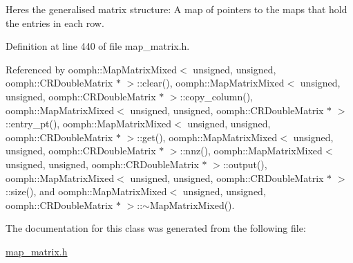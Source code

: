 Here\textquotesingle{}s the generalised matrix structure\+: A map of pointers to the maps that hold the entries in each row. 

Definition at line 440 of file map\+\_\+matrix.\+h.



Referenced by oomph\+::\+Map\+Matrix\+Mixed$<$ unsigned, unsigned, oomph\+::\+C\+R\+Double\+Matrix $\ast$ $>$\+::clear(), oomph\+::\+Map\+Matrix\+Mixed$<$ unsigned, unsigned, oomph\+::\+C\+R\+Double\+Matrix $\ast$ $>$\+::copy\+\_\+column(), oomph\+::\+Map\+Matrix\+Mixed$<$ unsigned, unsigned, oomph\+::\+C\+R\+Double\+Matrix $\ast$ $>$\+::entry\+\_\+pt(), oomph\+::\+Map\+Matrix\+Mixed$<$ unsigned, unsigned, oomph\+::\+C\+R\+Double\+Matrix $\ast$ $>$\+::get(), oomph\+::\+Map\+Matrix\+Mixed$<$ unsigned, unsigned, oomph\+::\+C\+R\+Double\+Matrix $\ast$ $>$\+::nnz(), oomph\+::\+Map\+Matrix\+Mixed$<$ unsigned, unsigned, oomph\+::\+C\+R\+Double\+Matrix $\ast$ $>$\+::output(), oomph\+::\+Map\+Matrix\+Mixed$<$ unsigned, unsigned, oomph\+::\+C\+R\+Double\+Matrix $\ast$ $>$\+::size(), and oomph\+::\+Map\+Matrix\+Mixed$<$ unsigned, unsigned, oomph\+::\+C\+R\+Double\+Matrix $\ast$ $>$\+::$\sim$\+Map\+Matrix\+Mixed().



The documentation for this class was generated from the following file\+:\begin{DoxyCompactItemize}
\item 
\hyperlink{map__matrix_8h}{map\+\_\+matrix.\+h}\end{DoxyCompactItemize}
